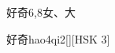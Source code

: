 \begin{entry}{好奇}{6,8}{⼥、⼤}
  \begin{phonetics}{好奇}{hao4qi2}[][HSK 3]
  \end{phonetics}
\end{entry}
